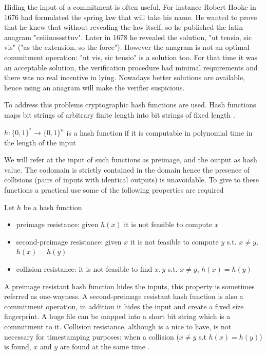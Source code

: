 Hiding the input of a commitment is often useful. For instance Robert Hooke \cite{Petroski96invention} in 1676 had formulated the spring law that will take his name. He wanted to prove that he knew that without revealing the law itself, so he published the latin anagram "ceiiinosssttuv". Later in 1678 he revealed the solution, "ut tensio, sic vis" ("as the extension, so the force"). However the anagram is not an optimal commitment operation: "ut vis, sic tensio" is a solution too. For that time it was an acceptable solution, the verification procedure had minimal requirements and there was no real incentive in lying. Nowadays better solutions are available, hence using an anagram will make the verifier suspicious.

To address this problems cryptographic hash functions are used. Hash functions maps bit strings of arbitrary finite length into bit strings of fixed length \cite{Damgard:1989:DPH:118209.118248}. 
\begin{mydef}
	$h : \{ 0, 1 \} ^* \rightarrow \{ 0, 1 \} ^n $ is a hash function if it is computable in polynomial time in the length of the input
\end{mydef}
We will refer at the input of such functions as preimage, and the output as hash value. The codomain is strictly contained in the domain hence the presence of collisions (pairs of inputs with identical outputs) is unavoidable. 
To give to these functions a practical use some of the following properties are required
\begin{mydef}
	\label{hash-prop}
	Let $h$ be a hash function
	\begin{itemize}
		\item preimage resistance: given $h(x)$ it is not feasible to compute $x$
		\item second-preimage resistance: given $x$ it is not feasible to compute $y$ s.t. $x \neq y$, $h(x)=h(y)$
		\item collision resistance: it is not feasible to find $x, y$ s.t. $x \neq y$, $h(x)=h(y)$
	\end{itemize}
\end{mydef}

A preimage resistant hash function hides the inputs, this property is sometimes referred as one-wayness.
A second-preimage resistant hash function is also a commitment operation, in addition it hides the input and create a fixed size fingerprint. A huge file can be mapped into a short bit string which is a commitment to it.
Collision resistance, although is a nice to have, is not necessary for timestamping purposes: when a collision ($x \neq y$ s.t $h(x)=h(y)$) is found, $x$ and $y$ are found at the same time \cite{SHA1}.

